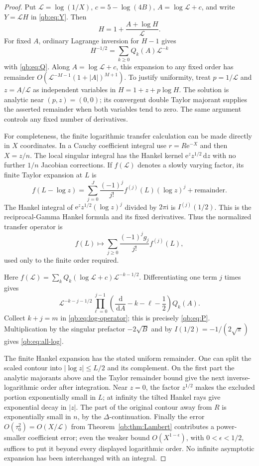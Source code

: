 \documentclass[11pt,a4paper]{article}
\theoremstyle{definition}\newtheorem{definition}[theorem]{Definition}
\theoremstyle{remark}\newtheorem{remark}[theorem]{Remark}
\newcommand{\ee}{\mathrm e}
\newcommand{\ii}{\mathrm i}
\newcommand{\dd}{\,\mathrm d}
\numberwithin{equation}{section}
\begin{document}
\begin{proof}
Put $\mathcal L=\log(1/X)$, $c=5-\log(4B)$,
$A=\log\mathcal L+c$, and write $Y=\mathcal L H$ in
\eqref{qb:eq:Y}. Then
\begin{equation}\label{qb:eq:H-Lambert}
 H=1+\frac{A+\log H}{\mathcal L}.
\end{equation}
For fixed $A$, ordinary Lagrange inversion for $H-1$ gives
\[
 H^{-1/2}=\sum_{k\ge0}Q_k(A)\mathcal L^{-k}
\]
with \eqref{qb:eq:Q}. Along $A=\log\mathcal L+c$, this expansion to any
fixed order has remainder
$O(\mathcal L^{-M-1}(1+|A|)^{M+1})$. To justify uniformity, treat
$p=1/\mathcal L$ and $z=A/\mathcal L$ as independent variables in
$H=1+z+p\log H$. The solution is analytic near $(p,z)=(0,0)$;
its convergent double Taylor majorant supplies the asserted remainder
when both variables tend to zero. The same argument controls any fixed
number of derivatives.

For completeness, the finite logarithmic transfer calculation can be
made directly in $X$ coordinates. In a Cauchy coefficient integral use
$r=R\ee^{-X}$ and then $X=z/n$. The local singular integral has the
Hankel kernel $\ee^z z^{1/2}\dd z$ with no further $1/n$ Jacobian
corrections. If $f(\mathcal L)$ denotes a slowly varying factor, its
finite Taylor expansion at $L$ is
\[
 f(L-\log z)=\sum_{j=0}^J
 \frac{(-1)^j}{j!}f^{(j)}(L)(\log z)^j+\text{remainder}.
\]
The Hankel integral of $\ee^z z^{1/2}(\log z)^j$ divided by $2\pi\ii$
is $I^{(j)}(1/2)$. This is the reciprocal-Gamma Hankel formula and its
fixed derivatives. Thus the normalized transfer operator is
\begin{equation}\label{qb:eq:log-operator}
 f(L)\longmapsto
 \sum_{j\ge0}\frac{(-1)^jg_j}{j!}f^{(j)}(L),
\end{equation}
used only to the finite order required.

Here $f(\mathcal L)=\sum_kQ_k(\log\mathcal L+c)
\mathcal L^{-k-1/2}$. Differentiating one term $j$ times gives
\[
 \mathcal L^{-k-j-1/2}
 \prod_{\ell=0}^{j-1}
 \left(\frac{\dd}{\dd A}-k-\ell-\frac12\right)Q_k(A).
\]
Collect $k+j=m$ in \eqref{qb:eq:log-operator}; this is precisely
\eqref{qb:eq:P}. Multiplication by the singular prefactor
$-2\sqrt B$ and by $I(1/2)=-1/(2\sqrt\pi)$ gives
\eqref{qb:eq:all-log}.

The finite Hankel expansion has the stated uniform remainder. One can
split the scaled contour into $|\log z|\le L/2$ and its complement.
On the first part the analytic majorants above and the Taylor remainder
bound give the next inverse-logarithmic order after integration. Near
$z=0$, the factor $z^{1/2}$ makes the excluded portion exponentially small
in $L$; at infinity the tilted Hankel rays give exponential decay in
$|z|$. The part of the original contour away from $R$ is exponentially
small in $n$, by the $\Delta$-continuation. Finally the error
$O(\tau_0^2)=O(X/\mathcal L)$ from
Theorem~\ref{qb:thm:Lambert} contributes a power-smaller coefficient
error; even the weaker bound $O(X^{1-\epsilon})$, with
$0<\epsilon<1/2$, suffices to put it beyond every displayed logarithmic
order. No infinite asymptotic expansion has been interchanged with an
integral.


\end{proof}
\end{document}

